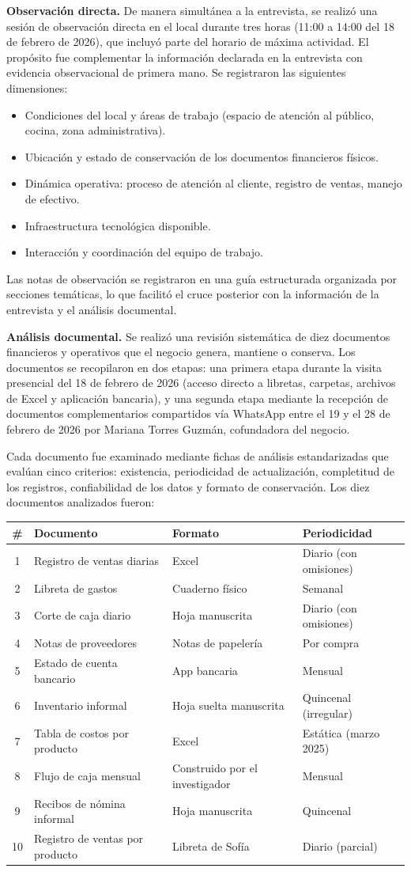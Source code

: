 \documentclass[
  12pt,
  spanish,
]{article}
\providecommand{\tightlist}{%
  \setlength{\itemsep}{0pt}\setlength{\parskip}{0pt}}
\begin{document}
\textbf{Observación directa.} De manera simultánea a la entrevista, se
realizó una sesión de observación directa en el local durante tres horas
(11:00 a 14:00 del 18 de febrero de 2026), que incluyó parte del horario
de máxima actividad. El propósito fue complementar la información
declarada en la entrevista con evidencia observacional de primera mano.
Se registraron las siguientes dimensiones:

\begin{itemize}
\tightlist
\item
  Condiciones del local y áreas de trabajo (espacio de atención al
  público, cocina, zona administrativa).
\item
  Ubicación y estado de conservación de los documentos financieros
  físicos.
\item
  Dinámica operativa: proceso de atención al cliente, registro de
  ventas, manejo de efectivo.
\item
  Infraestructura tecnológica disponible.
\item
  Interacción y coordinación del equipo de trabajo.
\end{itemize}

Las notas de observación se registraron en una guía estructurada
organizada por secciones temáticas, lo que facilitó el cruce posterior
con la información de la entrevista y el análisis documental.

\textbf{Análisis documental.} Se realizó una revisión sistemática de
diez documentos financieros y operativos que el negocio genera, mantiene
o conserva. Los documentos se recopilaron en dos etapas: una primera
etapa durante la visita presencial del 18 de febrero de 2026 (acceso
directo a libretas, carpetas, archivos de Excel y aplicación bancaria),
y una segunda etapa mediante la recepción de documentos complementarios
compartidos vía WhatsApp entre el 19 y el 28 de febrero de 2026 por
Mariana Torres Guzmán, cofundadora del negocio.

Cada documento fue examinado mediante fichas de análisis estandarizadas
que evalúan cinco criterios: existencia, periodicidad de actualización,
completitud de los registros, confiabilidad de los datos y formato de
conservación. Los diez documentos analizados fueron:

\begin{longtable}[]{@{}clll@{}}
\toprule
\# & Documento & Formato & Periodicidad\tabularnewline
\midrule
\endhead
1 & Registro de ventas diarias & Excel & Diario (con
omisiones)\tabularnewline
2 & Libreta de gastos & Cuaderno físico & Semanal\tabularnewline
3 & Corte de caja diario & Hoja manuscrita & Diario (con
omisiones)\tabularnewline
4 & Notas de proveedores & Notas de papelería & Por
compra\tabularnewline
5 & Estado de cuenta bancario & App bancaria & Mensual\tabularnewline
6 & Inventario informal & Hoja suelta manuscrita & Quincenal
(irregular)\tabularnewline
7 & Tabla de costos por producto & Excel & Estática (marzo
2025)\tabularnewline
8 & Flujo de caja mensual & Construido por el investigador &
Mensual\tabularnewline
9 & Recibos de nómina informal & Hoja manuscrita &
Quincenal\tabularnewline
10 & Registro de ventas por producto & Libreta de Sofía & Diario
(parcial)\tabularnewline
\bottomrule
\end{longtable}
\end{document}

